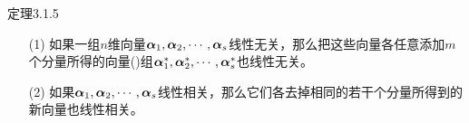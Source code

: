 


\begin{frame}
  \begin{footnotesize}
    \begin{block}{定理3.1.5}
      \begin{itemize}
      \item[(1)] 如果一组$n$维向量$\boldsymbol{\alpha}_1,\boldsymbol{\alpha}_2,\cdots,\boldsymbol{\alpha}_s$线性无关，那么把这些向量各任意添加$m$个分量所得的向量()组$\boldsymbol{\alpha}^*_1,\boldsymbol{\alpha}^*_2,\cdots,\boldsymbol{\alpha}^*_s$也线性无关。
      \item[(2)] 如果$\boldsymbol{\alpha}_1,\boldsymbol{\alpha}_2,\cdots,\boldsymbol{\alpha}_s$线性相关，那么它们各去掉相同的若干个分量所得到的新向量也线性相关。
      \end{itemize}
    \end{block}
  \end{footnotesize}
\end{frame}


